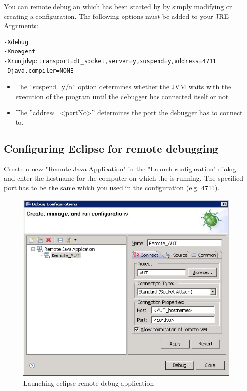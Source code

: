 You can remote debug an \gdaut{} which has been started by \jb{}
by simply modifying or creating a \gdaut{} configuration. The following options must be added to your JRE Arguments:

\begin{verbatim}
-Xdebug 
-Xnoagent 
-Xrunjdwp:transport=dt_socket,server=y,suspend=y,address=4711 
-Djava.compiler=NONE 
\end{verbatim}

\begin{itemize}
 \item The ''suspend=y/n'' option determines whether the JVM waits with the execution of the program until the debugger has connected itself or not.
 \item The ''address=<portNo>'' determines the port the debugger has to connect to.
\end{itemize}


\subsection{Configuring Eclipse for remote debugging}
Create a new "Remote Java Application" in the "Launch configuration" dialog 
and enter the hostname for the computer on which the \gdserver{} is running. The specified port has to be the same which you used in the \gdaut{} configuration (e.g. 4711).

\begin{figure}[h]
\includegraphics[width=\textwidth]{Debugging/PS/eclipseRemoteDebug}
\caption{Launching eclipse remote debug application}
\label{EclipseRemoteDebugging}
\end{figure}

